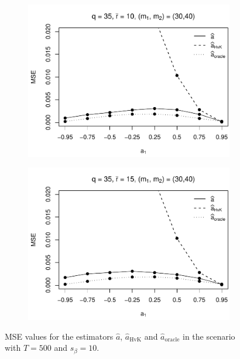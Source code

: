 \begin{figure}[p]
\begin{subfigure}[b]{0.45\textwidth}
\includegraphics[width=\textwidth]{Plots/Robustness/MSE_a1_zoomed_T=500_slope=10_(q,K1,K2,M1,M2)=(35,2,10,30,40).pdf}
\end{subfigure}
\hspace{0.25cm}
\begin{subfigure}[b]{0.45\textwidth}
\includegraphics[width=\textwidth]{Plots/Robustness/MSE_a1_zoomed_T=500_slope=10_(q,K1,K2,M1,M2)=(35,2,15,30,40).pdf}
\end{subfigure}
\caption{MSE values for the estimators $\widehat{a}$, $\widehat{a}_{\text{HvK}}$ and $\widehat{a}_{\text{oracle}}$ in the scenario with $T=500$ and $s_\beta=10$.}\label{fig:MSE_slope10_AR_zoom_robust} 
\end{figure}


